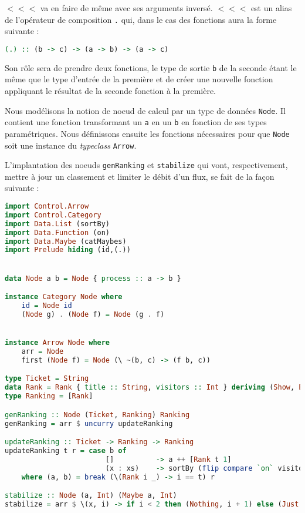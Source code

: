 \documentclass{llncs}
\newcommand{\Arrp}{\texttt{Arrow}. }
\begin{document}
$<<<$ va en faire de même avec ses arguments inversé.
$<<<$ est un alias de l'opérateur de composition \texttt{.} qui, dans le cas
des fonctions aura la forme suivante :
\begin{lstlisting}[language=haskell]
(.) :: (b -> c) -> (a -> b) -> (a -> c)
\end{lstlisting}
Son rôle sera de prendre deux fonctions, le type de sortie \texttt{b} de la seconde
étant le même que le type d'entrée de la première et de créer une nouvelle fonction
appliquant le résultat de la seconde fonction à la première.

Nous modélisons la notion de noeud de calcul par un type de données
\texttt{Node}.
Il contient une fonction transformant un \texttt{a} en un \texttt{b} en fonction
de ses types paramétriques.
Nous définissons ensuite les fonctions nécessaires pour que \texttt{Node} soit
une instance du \emph{typeclass} \Arrp

L'implantation des noeuds \texttt{genRanking} et \texttt{stabilize} qui vont,
respectivement, mettre à jour un classement et limiter le débit d'un flux,
se fait de la façon suivante :
\begin{lstlisting}[language=haskell]
import Control.Arrow
import Control.Category
import Data.List (sortBy)
import Data.Function (on)
import Data.Maybe (catMaybes)
import Prelude hiding (id,(.))


data Node a b = Node { process :: a -> b }

instance Category Node where
    id = Node id
    (Node g) . (Node f) = Node (g . f)


instance Arrow Node where
    arr = Node
    first (Node f) = Node (\ ~(b, c) -> (f b, c))

type Ticket = String
data Rank = Rank { title :: String, visitors :: Int } deriving (Show, Eq)
type Ranking = [Rank]

genRanking :: Node (Ticket, Ranking) Ranking
genRanking = arr $ uncurry updateRanking

updateRanking :: Ticket -> Ranking -> Ranking
updateRanking t r = case b of
                        []          -> a ++ [Rank t 1]
                        (x : xs)    -> sortBy (flip compare `on` visitors) (Rank t (1 + visitors x) : a ++ xs)
    where (a, b) = break (\(Rank i _) -> i == t) r

stabilize :: Node (a, Int) (Maybe a, Int)
stabilize = arr $ \(x, i) -> if i < 2 then (Nothing, i + 1) else (Just x, 0)
\end{lstlisting}
\end{document}
